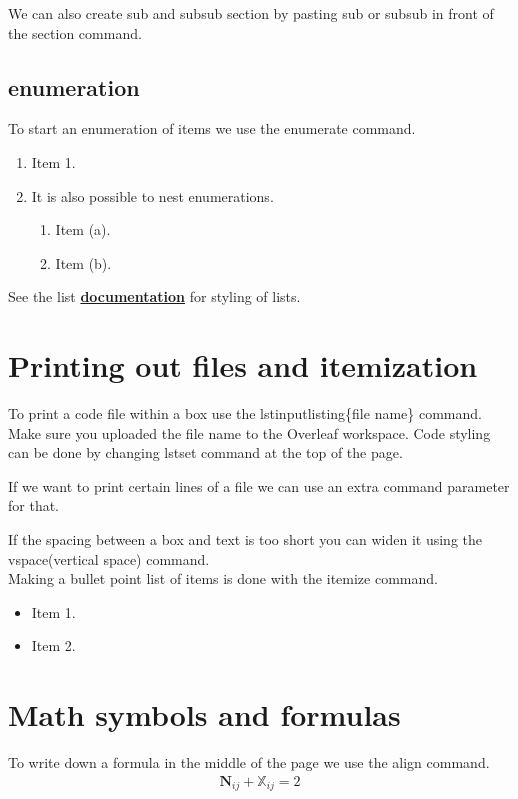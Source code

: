 \documentclass{article}
\begin{document}
We can also create sub and subsub section by pasting sub or subsub in front of the section command.
\subsection{enumeration}

To start an enumeration of items we use the enumerate command.
\begin{enumerate}
    \item Item 1.
    \item It is also possible to nest enumerations.
        \begin{enumerate}
            \item Item (a).
            \item Item (b).
        \end{enumerate}
\end{enumerate}

See the list \href{https://www.overleaf.com/learn/latex/Lists}{\bf{documentation}} for styling of lists.

\section{Printing out files and itemization}

To print a code file within a box use the lstinputlisting\{file name\} command. Make sure you uploaded the file name to the Overleaf workspace. Code styling can be done by changing lstset command at the top of the page.


If we want to print certain lines of a file we can use an extra command parameter for that.


\vspace{1cm}

If the spacing between a box and text is too short you can widen it using the vspace(vertical space) command.\\

Making a bullet point list of items is done with the itemize command.
\begin{itemize}
    \item Item 1.
    \item Item 2.
\end{itemize}

\section{Math symbols and formulas}
To write down a formula in the middle of the page we use the align command.
\begin{equation}\label{eq:exampleEquation}
\begin{split}
    \bm{N}_{ij} + \mathbb{X}_{ij} = 2
\end{split}
\end{equation}
    
\end{document}
